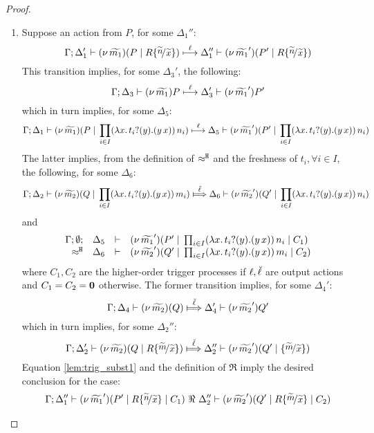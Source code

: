 \begin{proof}
	\begin{enumerate}
		\item	Suppose an action from $P$, for some $\Delta_1''$:
		\[
					\horel{\Gamma}{\Delta_1'}{\newsp{\widetilde{m_1}}{P \Par R \subst{\widetilde{n}}{\widetilde{x}} }}
					{\hby{\ell}}
					{\Delta_1''}{\newsp{\widetilde{m_1}'}{P' \Par R \subst{\widetilde{n}}{\widetilde{x}} }}
				\]
				This transition implies, for some $\Delta_3'$, the following:
				\[
					\Gamma; \Delta_3 \vdash (\nu\, \widetilde{m_1}){P} \stackrel{\ell}{\longmapsto} \Delta_3' \vdash (\nu\, \widetilde{m_1}'){P'}
				\]
				which in turn implies, for some $\Delta_5$:
				\[
					\Gamma; \Delta_1 \vdash (\nu\, \widetilde{m_1})(P \;|\; \prod_{i \in I} (\lambda x.\,t_i ? (y) . (y\, {x}))\, {n_i} ) \stackrel{\ell}{\longmapsto} \Delta_5 \vdash (\nu\, \widetilde{m_1}')(P' \;|\; \prod_{i \in I} (\lambda x.\,t_i ? (y) . (y\, {x}))\, {n_i} )
				\]
				The latter implies, from the definition of $\approx^\mathtt{H}$ and the
				freshness of $t_i, \forall i \in I$, the following,  for some $\Delta_6$:
				\[
					\horel{\Gamma}{\Delta_2}{\newsp{\widetilde{m_2}}{Q \Par \prod_{i \in I} \appl{(\trvalx{t_i})}{m_i} }}
					{\Hby{\mact{\ell}}}
					{\Delta_6}{\newsp{\widetilde{m_2}'}{Q' \Par \prod_{i \in I} \appl{(\trvalx{t_i})}{n_i} }}
				\]
				and
				\begin{eqnarray}
					\begin{array}{rcll} \Gamma; \emptyset; &\Delta_5& \vdash& (\nu\, \widetilde{m_1}')(P' \;|\; \prod_{i \in I} (\lambda x.\,t_i ? (y) . (y\, {x}))\, {n_i} \;|\; C_1)\\ \approx^\mathtt{H} &\Delta_6& \vdash &  (\nu\, \widetilde{m_2}')(Q' \;|\; \prod_{i \in I} (\lambda x.\,t_i ? (y) . (y\, {x}))\, {m_i} \;|\; C_2) \end{array}
					\label{lem:trig_subst1}
				\end{eqnarray}
				where $C_1, C_2$ are the higher-order trigger processes if $\ell, \breve{\ell}$ are output actions
				and $C_1 = C_2 = \mathbf{0}$ otherwise.
				The former transition implies, for some $\Delta_4'$:
				\[
					\horel{\Gamma}{\Delta_4}{\newsp{\widetilde{m_2}}{Q }}
					{\Hby{\mact{\ell}}}
					{\Delta_4'}{\news{\widetilde{m_2}'}{Q'}}
				\]
				which in turn implies, for some $\Delta_2''$:
				\[
					\horel{\Gamma}{\Delta_2'}{\newsp{\widetilde{m_2}}{Q \Par R \subst{\widetilde{m}}{\widetilde{x}}}}
					{\Hby{\mact{\ell}}}
					{\Delta_2''}{\newsp{\widetilde{m_2}'}{Q' \Par \subst{\widetilde{m}}{\widetilde{x}} }}
				\]
				Equation \eqref{lem:trig_subst1} and the definition of $\Re$ imply the desired conclusion for the case:
				\begin{eqnarray*}
					\horel{\Gamma}{\Delta_1''}{\newsp{\widetilde{m_1}'}{P' \Par R \subst{\widetilde{n}}{\widetilde{x}} \Par C_1}}
					{\ \Re\ }
					{\Delta_2''}{\newsp{\widetilde{m_2}'}{Q' \Par R \subst{\widetilde{m}}{\widetilde{x}} \Par C_2 }}
				\end{eqnarray*}


\end{enumerate}
\end{proof}
